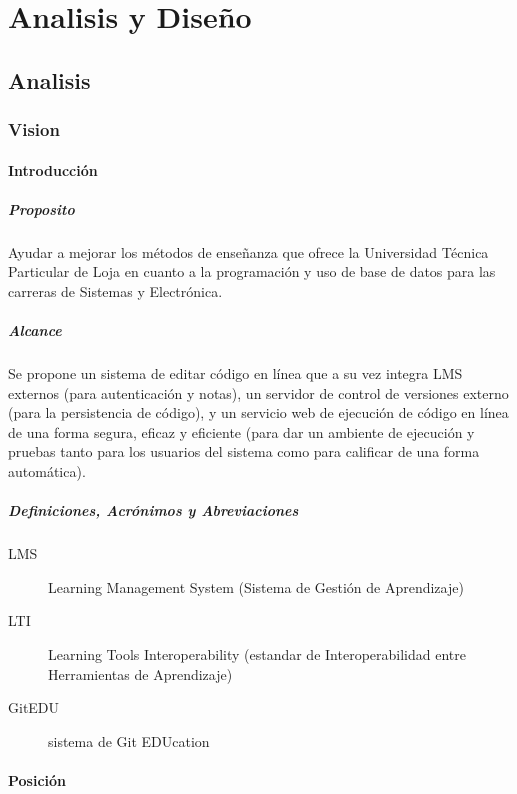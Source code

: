 
\chapter{Analisis y Diseño}
\label{capitulo3}

\section{Analisis}

\subsection{Vision}
\subsubsection{Introducción}
\paragraph{Proposito}
Ayudar a mejorar los métodos de enseñanza que ofrece la Universidad Técnica Particular de Loja en cuanto a la programación y uso de base de datos para las carreras de Sistemas y Electrónica.
\paragraph{Alcance}
Se propone un sistema de editar código en línea que a su vez integra LMS externos (para autenticación y notas), un servidor de control de versiones externo (para la persistencia de código), y un servicio web de ejecución de código en línea de una forma segura, eficaz y eficiente (para dar un ambiente de ejecución y pruebas tanto para los usuarios del sistema como para calificar de una forma automática).
\paragraph{Definiciones, Acrónimos y Abreviaciones}
\begin{description}
	\item[LMS] Learning Management System (Sistema de Gestión de Aprendizaje)
    \item[LTI] Learning Tools Interoperability (estandar de Interoperabilidad entre Herramientas de Aprendizaje)
    \item[GitEDU] sistema de Git EDUcation
\end{description}
\subsubsection{Posición}
